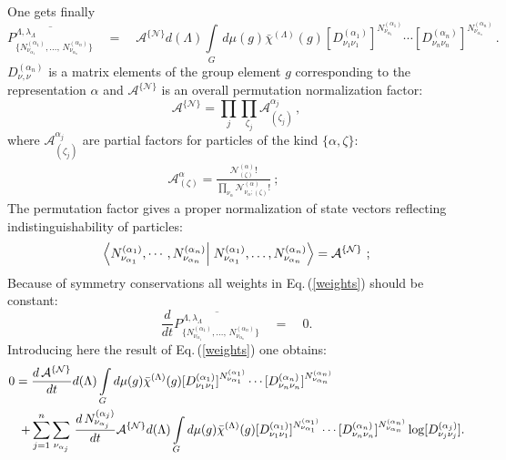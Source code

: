 \documentclass[a4paper,aps]{revtex4}
\begin{document}
One gets finally
\begin{equation} \label{weights}
\overline{P^{\Lambda,\lambda_{\Lambda}}_{\{N^{(\alpha_1)}_{\nu_{\alpha_1}},
\dots,\,N^{(\alpha_n)}_{\nu_{\alpha_n}}\}}}\quad = \quad {\mathcal
A}^{\{{\mathcal N}\}}
d(\Lambda)\int\limits_G\,d\mu(g)\bar\chi^{(\Lambda)}(g)
[D^{(\alpha_1)}_{\nu_1\nu_1}]^{N^{(\alpha_1)}_{\nu_{\alpha_1}}}
\cdots
[D^{(\alpha_n)}_{\nu_n\nu_n}]^{N^{(\alpha_n)}_{\nu_{\alpha_n}}}\,.
\end{equation}
$D^{(\alpha_n)}_{\nu,\nu}$ is a matrix elements of the group
element $g$ corresponding to the representation $\alpha$ and
${\mathcal A}^{\{{\mathcal N}\}}$ is an overall permutation
normalization factor:
\begin{equation}\label{faktor}
{\mathcal A}^{\{{\mathcal
N}\}}= \prod\limits_j\prod_{\zeta_j}{\mathcal
A}^{\alpha_j}_{(\zeta_j)}\,,
\end{equation}
where ${\mathcal A}^{\alpha_j}_{(\zeta_j)}$ are partial factors for
particles of the kind $\{\alpha,\zeta\}:$
\begin{eqnarray}\label{faktorp}
{\mathcal A}^\alpha_{(\zeta)}= \frac{{\mathcal
N}^{(\alpha)}_{(\zeta)}!}{\prod\limits_{\nu_\alpha} {\mathcal
N}^{(\alpha)}_{\nu_\alpha;(\zeta)}!}\ ; \qquad
\end{eqnarray}
The permutation factor gives a proper normalization of state vectors
reflecting indistinguishability of particles:
\begin{equation}\label{norma}
\left\langle N^{(\alpha_1)}_{\nu_{\alpha_1}},
\cdots,N^{(\alpha_n)}_{\nu_{\alpha_n}}\right\vert \left.
N^{(\alpha_1)}_{\nu_{\alpha_1}},\dots,
N^{(\alpha_n)}_{\nu_{\alpha_n}}\right\rangle={\cal A}^{\{{\cal
N}\}}\ ;
\end{equation}
Because of symmetry conservations all weights in
Eq.\,(\ref{weights}) should be constant:
\begin{equation} \label{cond}
\frac{d}{dt}\overline{P^{\Lambda,\lambda_{\Lambda}}_{\{N^{(\alpha_1)}_{\nu_{\alpha_1}},
\dots,\,N^{(\alpha_n)}_{\nu_{\alpha_n}}\}}}\quad =\quad 0 .
\end{equation}
Introducing  here the result of Eq.\,(\ref{weights}) one obtains:
\begin{eqnarray} \label{deriv}
\lefteqn{0 = \frac{d\,{\mathcal A}^{\{{\mathcal
N}\}}}{dt}d(\Lambda)\int\limits_G d\mu(g)\bar\chi^{(\Lambda)}(g)
[D^{(\alpha_1)}_{\nu_1\nu_1}]^{N^{(\alpha_1)}_{\nu_{\alpha_1}}}\cdots
[D^{(\alpha_n)}_{\nu_n\nu_n}]^{N^{(\alpha_n)}_{\nu_{\alpha_n}}}}\\ & &
+\sum_{j=1}^n\sum_{\nu_{\alpha_j}}\,
\frac{d\,N^{(\alpha_j)}_{\nu_{\alpha_j}}}{dt} {\mathcal
A}^{\{{\mathcal N}\}}d(\Lambda)\int\limits_G
d\mu(g)\bar\chi^{(\Lambda)}(g)
[D^{(\alpha_1)}_{\nu_1\nu_1}]^{N^{(\alpha_1)}_{\nu_{\alpha_1}}}
\cdots
[D^{(\alpha_n)}_{\nu_n\nu_n}]^{N^{(\alpha_n)}_{\nu_{\alpha_n}}}
\log[D^{(\alpha_j)}_{\nu_j\nu_j}] .\nonumber
\end{eqnarray}
\end{document}
